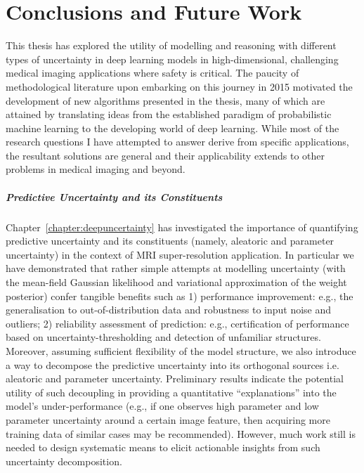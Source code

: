 \chapter{Conclusions and Future Work} \label{chapter:conclusions}

This thesis has explored the utility of modelling and reasoning with different types of uncertainty in deep learning models in high-dimensional, challenging medical imaging applications where safety is critical. The paucity of methodological literature upon embarking on this journey in 2015 motivated the development of new algorithms presented in the thesis, many of which are attained by translating ideas from the established paradigm of probabilistic machine learning to the developing world of deep learning. While most of the research questions I have attempted to answer derive from specific applications, the resultant solutions are general and their applicability extends to other problems in medical imaging and beyond. 

\paragraph{Predictive Uncertainty and its Constituents}
Chapter~\ref{chapter:deepuncertainty} has investigated the importance of quantifying predictive uncertainty and its constituents (namely, aleatoric and parameter uncertainty) in the context of MRI super-resolution application. In particular we have demonstrated that rather simple attempts at modelling uncertainty (with the mean-field Gaussian likelihood and variational approximation of the weight posterior) confer tangible benefits such as 1) performance improvement: e.g., the generalisation to out-of-distribution data and robustness to input noise and outliers; 2) reliability assessment of prediction: e.g., certification of performance based on uncertainty-thresholding and detection of unfamiliar structures. Moreover, assuming sufficient flexibility of the model structure, we also introduce a way to decompose the predictive uncertainty into its orthogonal sources i.e. aleatoric and parameter uncertainty. Preliminary results indicate the potential utility of such decoupling in providing a quantitative ``explanations'' into the model's under-performance (e.g., if one observes high parameter and low parameter uncertainty around a certain image feature, then acquiring more training data of similar cases may be recommended). However, much work still is needed to design systematic means to elicit actionable insights from such uncertainty decomposition. 

